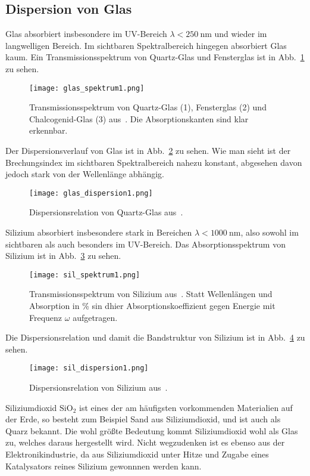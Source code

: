 \subsection{\label{subsec:FZV6}Dispersion von Glas}
Glas absorbiert insbesondere im UV-Bereich $\lambda < \SI[]{250}{\nano\metre}$ und wieder im langwelligen Bereich. Im sichtbaren Spektralbereich hingegen absorbiert Glas kaum. Ein Transmissionsspektrum von Quartz-Glas und Fensterglas ist in Abb.~\ref{fig:glasabs} zu sehen.

\begin{figure}
    \centering
    \texttt{[image: glas\_spektrum1.png]}
    \caption{Transmissionsspektrum von Quartz-Glas (1), Fensterglas (2) und Chalcogenid-Glas (3) aus~\cite{glass}. Die Absorptionskanten sind klar erkennbar.}
    \label{fig:glasabs}
\end{figure}

Der Dispersionsverlauf von Glas ist in Abb.~\ref{fig:glasdisp} zu sehen. Wie man sieht ist der Brechungsindex im sichtbaren Spektralbereich nahezu konstant, abgesehen davon jedoch stark von der Wellenlänge abhängig.

\begin{figure}
    \centering
    \texttt{[image: glas\_dispersion1.png]}
    \caption{Dispersionsrelation von Quartz-Glas aus~\cite{glass}.}
    \label{fig:glasdisp}
\end{figure}

Silizium absorbiert insbesondere stark in Bereichen $\lambda < \SI[]{1000}{\nano\metre}$, also sowohl im sichtbaren als auch besonders im UV-Bereich. Das Absorptionsspektrum von Silizium ist in Abb.~\ref{fig:siliziumabs} zu sehen.  

\begin{figure}
    \centering
    \texttt{[image: sil\_spektrum1.png]}
    \caption{Transmissionsspektrum von Silizium aus~\cite{silicon}. Statt Wellenlängen und Absorption in \% sin dhier Absorptionskoeffizient gegen Energie mit Frequenz $\omega$ aufgetragen.}
    \label{fig:siliziumabs}
\end{figure}

Die Dispersionsrelation und damit die Bandstruktur von Silizium ist in Abb.~\ref{fig:sildisp} zu sehen. 

\begin{figure}
    \centering
    \texttt{[image: sil\_dispersion1.png]}
    \caption{Dispersionsrelation von Silizium aus~\cite{silicon}.}
    \label{fig:sildisp}
\end{figure}

Siliziumdioxid $\mathrm{SiO}_2$ ist eines der am häufigsten vorkommenden Materialien auf der Erde, so besteht zum Beispiel Sand aus Siliziumdioxid, und ist auch als Quarz bekannt. Die wohl größte Bedeutung kommt Siliziumdioxid wohl als Glas zu, welches daraus hergestellt wird. Nicht wegzudenken ist es ebenso aus der Elektronikindustrie, da aus Siliziumdioxid unter Hitze und Zugabe eines Katalysators reines Silizium gewonnnen werden kann.